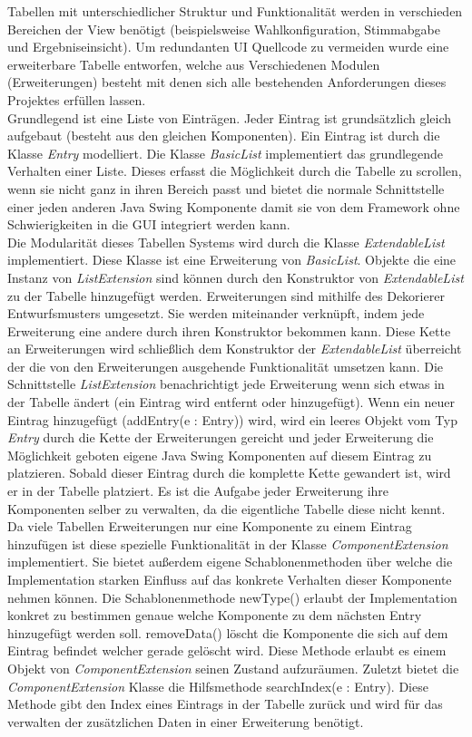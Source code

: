 \documentclass[parskip=full]{scrartcl}
\begin{document}
		Tabellen mit unterschiedlicher Struktur und Funktionalität werden in verschieden Bereichen der View benötigt (beispielsweise Wahlkonfiguration, Stimmabgabe und Ergebniseinsicht). Um redundanten UI Quellcode zu vermeiden wurde eine erweiterbare Tabelle entworfen, welche aus Verschiedenen Modulen (Erweiterungen) besteht mit denen sich alle bestehenden Anforderungen dieses Projektes erfüllen lassen.
		\\
		Grundlegend ist eine Liste von Einträgen. Jeder Eintrag ist grundsätzlich gleich aufgebaut (besteht aus den gleichen Komponenten). Ein Eintrag ist durch die Klasse \textit{Entry} modelliert. Die Klasse \textit{BasicList} implementiert das grundlegende Verhalten einer Liste. Dieses erfasst die Möglichkeit durch die Tabelle zu scrollen, wenn sie nicht ganz in ihren Bereich passt und bietet die normale Schnittstelle einer jeden anderen Java Swing Komponente damit sie von dem Framework ohne Schwierigkeiten in die GUI integriert werden kann.
		\\
		Die Modularität dieses Tabellen Systems wird durch die Klasse \textit{ExtendableList} implementiert. Diese Klasse ist eine Erweiterung von \textit{BasicList}. Objekte die eine Instanz von \textit{ListExtension} sind können durch den Konstruktor von \textit{ExtendableList} zu der Tabelle hinzugefügt werden. Erweiterungen sind mithilfe des Dekorierer Entwurfsmusters umgesetzt. Sie werden miteinander verknüpft, indem jede Erweiterung eine andere durch ihren Konstruktor bekommen kann. Diese Kette an Erweiterungen wird schließlich dem Konstruktor der \textit{ExtendableList} überreicht der die von den Erweiterungen ausgehende Funktionalität umsetzen kann. Die Schnittstelle \textit{ListExtension} benachrichtigt jede Erweiterung wenn sich etwas in der Tabelle ändert (ein Eintrag wird entfernt oder hinzugefügt). Wenn ein neuer Eintrag hinzugefügt (addEntry(e : Entry)) wird, wird ein leeres Objekt vom Typ \textit{Entry} durch die Kette der Erweiterungen gereicht und jeder Erweiterung die Möglichkeit geboten eigene Java Swing Komponenten auf diesem Eintrag zu platzieren. Sobald dieser Eintrag durch die komplette Kette gewandert ist, wird er in der Tabelle platziert. Es ist die Aufgabe jeder Erweiterung ihre Komponenten selber zu verwalten, da die eigentliche Tabelle diese nicht kennt. Da viele Tabellen Erweiterungen nur eine Komponente zu einem Eintrag hinzufügen ist diese spezielle Funktionalität in der Klasse \textit{ComponentExtension} implementiert. Sie bietet außerdem eigene Schablonenmethoden über welche die Implementation starken Einfluss auf das konkrete Verhalten dieser Komponente nehmen können. Die Schablonenmethode newType() erlaubt der Implementation konkret zu bestimmen genaue welche Komponente zu dem nächsten Entry hinzugefügt werden soll. removeData() löscht die Komponente die sich auf dem Eintrag befindet welcher gerade gelöscht wird. Diese Methode erlaubt es einem Objekt von \textit{ComponentExtension} seinen Zustand aufzuräumen. Zuletzt bietet die \textit{ComponentExtension} Klasse die Hilfsmethode searchIndex(e : Entry). Diese Methode gibt den Index eines Eintrags in der Tabelle zurück und wird für das verwalten der zusätzlichen Daten in einer Erweiterung benötigt.
\end{document}
